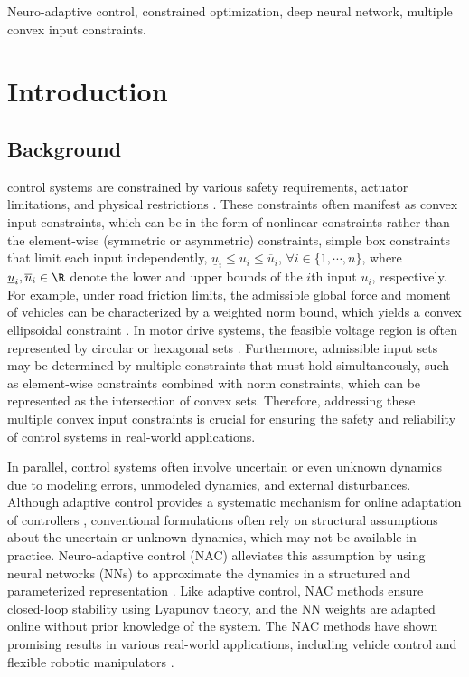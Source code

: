 \documentclass[letterpaper, journal]{IEEEtran}
\begin{document}
\begin{IEEEkeywords}
  Neuro-adaptive control, constrained optimization, deep neural network,  multiple convex input constraints.
\end{IEEEkeywords}

\section{Introduction}

\subsection{Background}

 control systems are constrained by various safety requirements, actuator limitations, and physical restrictions \cite{Ji:2025aa}.
These constraints often manifest as convex input constraints, which can be in the form of nonlinear constraints rather than the element-wise (symmetric or asymmetric) constraints, \ie 
simple box constraints that limit each input independently, \ie $\underline{u}_i\le u_i\le\overline{u}_i$, $\forall i\in\{1,\cdots,n\}$, where $\underline{u}_i,\overline{u}_i\in\R$ denote the lower and upper bounds of the $i$th input $u_i$, respectively.
For example, under road friction limits, the admissible global force and moment of vehicles can be characterized by a weighted norm bound, which yields a convex ellipsoidal constraint \cite{Chen:2024aa}.
In motor drive systems, the feasible voltage region is often represented by circular \cite{Ryu:2025aa} or hexagonal sets \cite{Monzen:2026aa}.
Furthermore, admissible input sets may be determined by multiple constraints that must hold simultaneously, such as element-wise constraints combined with norm constraints, which can be represented as the intersection of convex sets.
Therefore, addressing these multiple convex input constraints is crucial for ensuring the safety and reliability of control systems in real-world applications.

In parallel, control systems often involve uncertain or even unknown dynamics due to modeling errors, unmodeled dynamics, and external disturbances.
Although adaptive control provides a systematic mechanism for online adaptation of controllers \cite{Ioannou:2006aa}, conventional formulations often rely on structural assumptions about the uncertain or unknown dynamics, which may not be available in practice.
Neuro-adaptive control (NAC) alleviates this assumption by using neural networks (NNs) to approximate the dynamics in a structured and parameterized representation \cite{Farrell:2006aa,Patil:2022aa}.
Like adaptive control, NAC methods ensure closed-loop stability using Lyapunov theory, and the NN weights are adapted online without prior knowledge of the system.
The NAC methods have shown promising results in various real-world applications, including vehicle control \cite{You:2023aa} and flexible robotic manipulators \cite{Gao:2026aa}.
\end{document}
